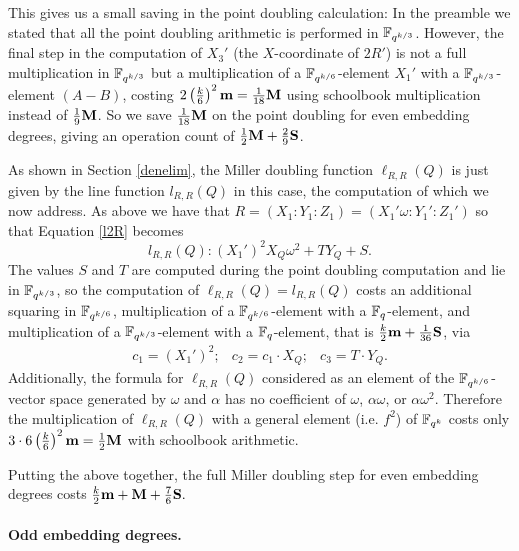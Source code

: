 This gives us a small saving in the point doubling calculation:
In the preamble we stated that all the point doubling arithmetic is performed 
in $\mathbb{F}_{q^{k/3}}$. 
However, the final step in the computation of $X_3'$
(the $X$-coordinate of $2R'$) is not a full multiplication in $\mathbb{F}_{q^{k/3}}$
but a multiplication of a $\mathbb{F}_{q^{k/6}}$-element $X_1'$ with a 
$\mathbb{F}_{q^{k/3}}$-element $(A-B)$,
costing $2\left(\frac{k}{6}\right)^2\textbf{m} = \frac{1}{18}\textbf{M}$
using schoolbook multiplication instead of $\frac{1}{9}\textbf{M}$.
So we save $\frac{1}{18}\textbf{M}$ on the point doubling for even embedding degrees, giving an operation count of $\frac{1}{2}\textbf{M} + \frac{2}{9}\textbf{S}$.

As shown in Section \ref{denelim}, the Miller doubling function $\ell_{R,R}(Q)$ is just given by the line function $l_{R,R}(Q)$ in this case, the computation of which we now address.
As above we have that $R = (X_1:Y_1:Z_1) = (X_1'\omega:Y_1':Z_1')$ 
so that Equation \eqref{l2R} becomes
\[l_{R,R}(Q): (X_1')^2X_Q\omega^2 + T Y_Q + S.\]
The values $S$ and $T$ are computed during the point doubling computation and lie in $\mathbb{F}_{q^{k/3}}$,
so the computation of $\ell_{R,R}(Q) = l_{R,R}(Q)$ costs an additional squaring in $\mathbb{F}_{q^{k/6}}$, multiplication of a $\mathbb{F}_{q^{k/6}}$-element with a $\mathbb{F}_{q}$-element, and multiplication of a $\mathbb{F}_{q^{k/3}}$-element with a $\mathbb{F}_{q}$-element, that is 
$\frac{k}{2}\textbf{m} + \frac{1}{36}\textbf{S}$, via
\[\begin{array}{ccc}
c_1 = (X_1')^2; & c_2 = c_1 \cdot  X_Q; & c_3 = T \cdot Y_Q.
\end{array}\]
Additionally, the formula for $\ell_{R,R}(Q)$ considered as an element of the $\mathbb{F}_{q^{k/6}}$-vector space generated by $\omega$ and $\alpha$ has no coefficient of $\omega$, $\alpha\omega$, or $\alpha\omega^2$.
Therefore the multiplication of $\ell_{R,R}(Q)$ with a general element 
(i.e. $f^2$) of
$\mathbb{F}_{q^k}$ costs only $3\cdot 6\left(\frac{k}{6}\right)^2\textbf{m}= \frac{1}{2}\textbf{M}$ with schoolbook arithmetic.

Putting the above together, the full Miller doubling step for even embedding degrees costs
$\frac{k}{2}\textbf{m} + \textbf{M} + \frac{7}{6}\textbf{S}.$

\paragraph*{Odd embedding degrees.}

